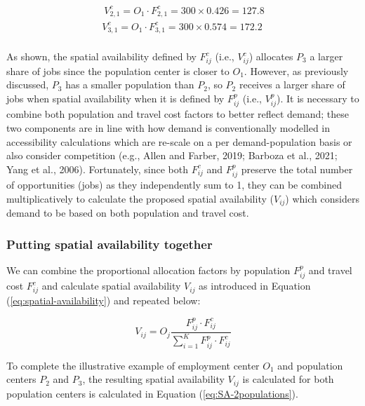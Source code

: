 \documentclass[]{elsarticle} %
\begin{document}
\begin{equation}
\label{eq:tcost-allocation-factor-SA-2populations}
\begin{array}{l}\
V^c_{2,1} = O_1 \cdot F^c_{2,1} = 300 \times 0.426 = 127.8\\
V^c_{3,1} = O_1 \cdot F^c_{3,1} = 300 \times  0.574 = 172.2\\
\end{array}
\end{equation}

As shown, the spatial availability defined by \(F^c_{ij}\) (i.e.,
\(V^c_{ij}\)) allocates \(P_3\) a larger share of jobs since the
population center is closer to \(O_1\). However, as previously
discussed, \(P_3\) has a smaller population than \(P_2\), so \(P_2\)
receives a larger share of jobs when spatial availability when it is
defined by \(F^p_{ij}\) (i.e., \(V^p_{ij}\)). It is necessary to combine
both population and travel cost factors to better reflect demand; these
two components are in line with how demand is conventionally modelled in
accessibility calculations which are re-scale on a per demand-population
basis or also consider competition (e.g., Allen and Farber, 2019;
Barboza et al., 2021; Yang et al., 2006). Fortunately, since both
\(F^c_{ij}\) and \(F^p_{ij}\) preserve the total number of opportunities
(jobs) as they independently sum to 1, they can be combined
multiplicatively to calculate the proposed spatial availability
(\(V_{ij}\)) which considers demand to be based on both population and
travel cost.

\hypertarget{putting-spatial-availability-together}{%
\subsubsection{Putting spatial availability
together}\label{putting-spatial-availability-together}}

We can combine the proportional allocation factors by population
\(F^p_{ij}\) and travel cost \(F^c_{ij}\) and calculate spatial
availability \(V_{ij}\) as introduced in Equation
(\ref{eq:spatial-availability}) and repeated below:

\[
V_{ij} = O_j\frac{F^p_{ij} \cdot F^c_{ij}}{\sum_{i=1}^K F^p_{ij} \cdot F^c_{ij}}
\]

To complete the illustrative example of employment center \(O_1\) and
population centers \(P_2\) and \(P_3\), the resulting spatial
availability \(V_{ij}\) is calculated for both population centers is
calculated in Equation (\ref{eq:SA-2populations}).
\end{document}
